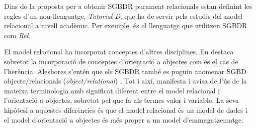 Dins de la proposta per a obtenir SGBDR purament relacionals
\textcite{date06:_datab_types_relat_model,date:tutoriald} estan
definint les regles d'un nou llenguatge, \emph{Tutorial D}, que ha de
servir pels estudis del model relacional a nivell acadèmic. Per
exemple, és el llenguatge que utilitzen SGBDR com \emph{Rel}.


El model relacional ha incorporat conceptes d'altres disciplines. En
destaca sobretot la incorporació de conceptes d'orientació a objectes
com és el cas de l'herència.  Aleshores s'entén que els SGBDR també es
puguin anomenar SGBD objecte/relacionals (\emph{object/relational})
\parencite{date02:foundation}.  Tot i així, \textcite[cap.~6]{date06}
manifesta i avisa de l'ús de la mateixa terminologia amb significat
diferent entre el model relacional i l'orientació a objectes, sobretot
pel que fa als termes valor i variable. %
La seva hipòtesi a aquestes diferències és que el model relacional és
un model de dades i el model d'orientació a objectes és més proper a
un model
d'emmagatzematge. %



